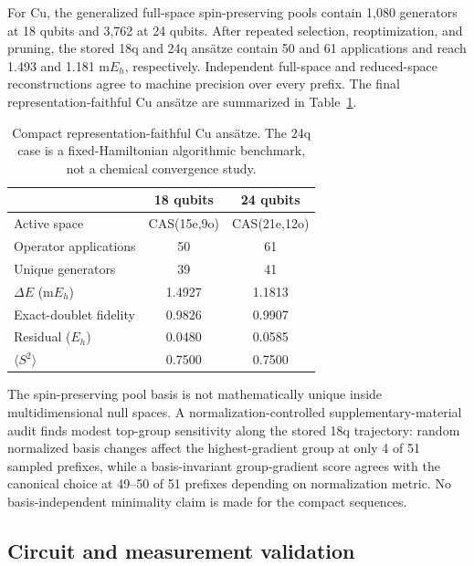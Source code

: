 \documentclass[
 aip,
 jcp,
 amsmath,amssymb,
 preprint
]{revtex4-2}
\begin{document}
For Cu, the generalized full-space spin-preserving pools contain 1,080 generators at 18 qubits and 3,762 at 24 qubits.
After repeated selection, reoptimization, and pruning, the stored 18q and 24q ans\"atze contain 50 and 61 applications and reach 1.493 and 1.181 m$E_h$, respectively.
Independent full-space and reduced-space reconstructions agree to machine precision over every prefix.
The final representation-faithful Cu ans\"atze are summarized in Table~\ref{tab:main}.

\begin{table}[htbp]
\centering
\small
\caption{Compact representation-faithful Cu ans\"atze. The 24q case is a fixed-Hamiltonian algorithmic benchmark, not a chemical convergence study.}
\label{tab:main}
\begin{tabular}{lcc}
\toprule
& 18 qubits & 24 qubits\\
\midrule
Active space & CAS(15e,9o) & CAS(21e,12o)\\
Operator applications & 50 & 61\\
Unique generators & 39 & 41\\
$\Delta E$ (m$E_h$) & 1.4927 & 1.1813\\
Exact-doublet fidelity & 0.9826 & 0.9907\\
Residual ($E_h$) & 0.0480 & 0.0585\\
$\langle S^2\rangle$ & 0.7500 & 0.7500\\
\bottomrule
\end{tabular}
\end{table}

The spin-preserving pool basis is not mathematically unique inside multidimensional null spaces.
A normalization-controlled supplementary-material audit finds modest top-group sensitivity along the stored 18q trajectory: random normalized basis changes affect the highest-gradient group at only 4 of 51 sampled prefixes, while a basis-invariant group-gradient score agrees with the canonical choice at 49--50 of 51 prefixes depending on normalization metric.
No basis-independent minimality claim is made for the compact sequences.

\subsection{Circuit and measurement validation}
\end{document}
